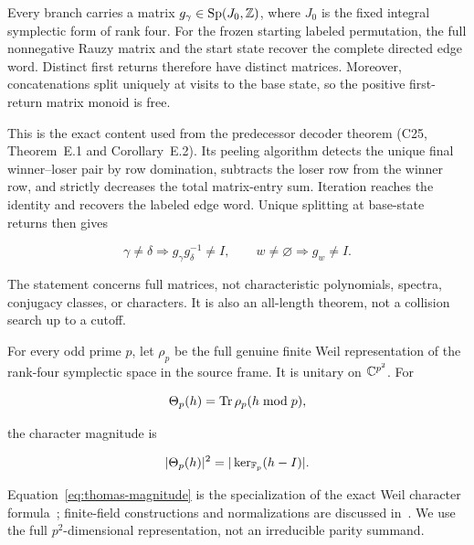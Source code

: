 \begin{hypothesis}
\label{hyp:decoder}
Every branch carries a matrix
\(g_\gamma\in\operatorname{Sp}(J_0,\mathbb Z)\), where \(J_0\) is the fixed integral symplectic
form of rank four.  For the frozen starting labeled permutation, the full
nonnegative Rauzy matrix and the start state recover the complete directed
edge word.  Distinct first returns therefore have distinct matrices.
Moreover, concatenations split uniquely at visits to the base state, so the
positive first-return matrix monoid is free.
\end{hypothesis}

This is the exact content used from the predecessor decoder theorem
(C25, Theorem~E.1 and Corollary~E.2).  Its peeling algorithm detects the
unique final winner--loser pair by row domination, subtracts the loser row
from the winner row, and strictly decreases the total matrix-entry sum.
Iteration reaches the identity and recovers the labeled edge word.  Unique
splitting at base-state returns then gives

\begin{equation}
 \gamma\ne\delta\Longrightarrow g_\gamma g_\delta^{-1}\ne I,
 \qquad
 w\ne\varnothing\Longrightarrow g_w\ne I.
 \label{eq:decoder-consequences}
\end{equation}

The statement concerns full matrices, not characteristic polynomials,
spectra, conjugacy classes, or characters.  It is also an all-length theorem,
not a collision search up to a cutoff.

\begin{hypothesis}
\label{hyp:weil}
For every odd prime \(p\), let \(\rho_p\) be the full genuine finite Weil
representation of the rank-four symplectic space in the source frame.  It is
unitary on \(\mathbb C^{p^2}\).  For

\begin{equation}
 \Theta_p(h)=\operatorname{Tr}\rho_p(h\bmod p),
 \label{eq:theta-def}
\end{equation}

the character magnitude is

\begin{equation}
 |\Theta_p(h)|^2
 =|\ker_{\mathbb F_p}(h-I)|.
 \label{eq:thomas-magnitude}
\end{equation}
\end{hypothesis}

Equation~\eqref{eq:thomas-magnitude} is the specialization of the exact Weil
character formula~\citep{thomas2008}; finite-field constructions and
normalizations are discussed in~\citet{gurevich2009}.  We use the full
\(p^2\)-dimensional representation, not an irreducible parity summand.

